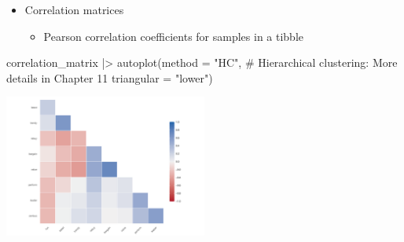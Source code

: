 \documentclass[
  ignorenonframetext,
]{beamer}
\newenvironment{Shaded}{\begin{snugshade}}{\end{snugshade}}
\newcommand{\AttributeTok}[1]{\textcolor[rgb]{0.40,0.45,0.13}{#1}}
\newcommand{\CommentTok}[1]{\textcolor[rgb]{0.37,0.37,0.37}{#1}}
\newcommand{\FunctionTok}[1]{\textcolor[rgb]{0.28,0.35,0.67}{#1}}
\newcommand{\NormalTok}[1]{\textcolor[rgb]{0.00,0.23,0.31}{#1}}
\newcommand{\SpecialCharTok}[1]{\textcolor[rgb]{0.37,0.37,0.37}{#1}}
\newcommand{\StringTok}[1]{\textcolor[rgb]{0.13,0.47,0.30}{#1}}
\providecommand{\tightlist}{%
  \setlength{\itemsep}{0pt}\setlength{\parskip}{0pt}}\usepackage{longtable,booktabs,array}
\begin{document}
\begin{frame}[fragile]{}
\label{section-7}
\begin{itemize}
\item
  Correlation matrices

  \begin{itemize}
  \tightlist
  \item
    Pearson correlation coefficients for samples in a tibble
  \end{itemize}
\end{itemize}

\tiny

\begin{Shaded}
\begin{Highlighting}[]
\NormalTok{correlation\_matrix }\SpecialCharTok{|\textgreater{}} 
  \FunctionTok{autoplot}\NormalTok{(}\AttributeTok{method =} \StringTok{"HC"}\NormalTok{, }\CommentTok{\# Hierarchical clustering: More details in Chapter 11 }
           \AttributeTok{triangular =} \StringTok{"lower"}\NormalTok{)}
\end{Highlighting}
\end{Shaded}

\begin{center}
\includegraphics[width=0.5\textwidth,height=\textheight]{008_reducing_data_complexity_files/figure-beamer/unnamed-chunk-6-1.pdf}
\end{center}
\end{frame}
\end{document}
